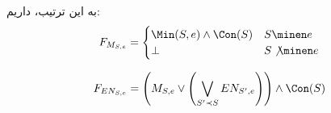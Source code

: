 به این ترتیب، داریم:
\begin{equation*}
  F_{M_{S,e}} = \begin{cases}
    \Min(S,e) \wedge \Con(S) & S \minen e \\
    \bot                     & S \not\minen e
  \end{cases}
\end{equation*}

\begin{equation*}
  F_{EN_{S,e}} = \left(
    M_{S,e} \vee
    \left( \bigvee_{S' \prec S} EN_{S',e} \right)
  \right) \wedge \Con(S)
\end{equation*}
